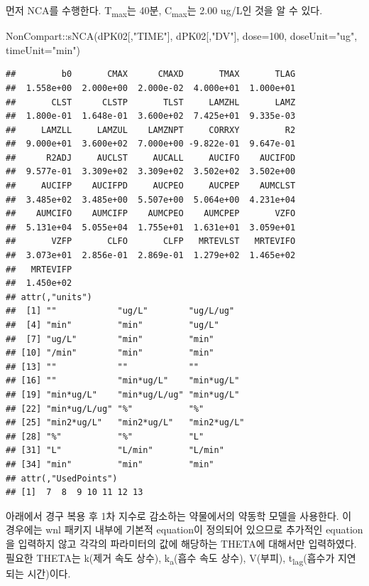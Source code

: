 \documentclass[
  11pt,
  krantz2, a4paper, twoside]{krantz}
\newenvironment{Shaded}{\begin{snugshade}}{\end{snugshade}}
\newcommand{\AttributeTok}[1]{\textcolor[rgb]{0.77,0.63,0.00}{#1}}
\newcommand{\DecValTok}[1]{\textcolor[rgb]{0.00,0.00,0.81}{#1}}
\newcommand{\FunctionTok}[1]{\textcolor[rgb]{0.00,0.00,0.00}{#1}}
\newcommand{\NormalTok}[1]{#1}
\newcommand{\SpecialCharTok}[1]{\textcolor[rgb]{0.00,0.00,0.00}{#1}}
\newcommand{\StringTok}[1]{\textcolor[rgb]{0.31,0.60,0.02}{#1}}
\theoremstyle{definition}
\theoremstyle{definition}
\theoremstyle{definition}
\theoremstyle{definition}
\theoremstyle{remark}
\begin{document}
먼저 NCA를 수행한다. T\textsubscript{max}는 40분, C\textsubscript{max}는 2.00 ug/L인 것을 알 수 있다.

\begin{Shaded}
\begin{Highlighting}[]
\NormalTok{NonCompart}\SpecialCharTok{::}\FunctionTok{sNCA}\NormalTok{(dPK02[,}\StringTok{"TIME"}\NormalTok{], dPK02[,}\StringTok{"DV"}\NormalTok{], }
                 \AttributeTok{dose=}\DecValTok{100}\NormalTok{, }\AttributeTok{doseUnit=}\StringTok{"ug"}\NormalTok{, }\AttributeTok{timeUnit=}\StringTok{"min"}\NormalTok{)}
\end{Highlighting}
\end{Shaded}

\begin{verbatim}
##         b0       CMAX      CMAXD       TMAX       TLAG 
##  1.558e+00  2.000e+00  2.000e-02  4.000e+01  1.000e+01 
##       CLST      CLSTP       TLST     LAMZHL       LAMZ 
##  1.800e-01  1.648e-01  3.600e+02  7.425e+01  9.335e-03 
##     LAMZLL     LAMZUL    LAMZNPT     CORRXY         R2 
##  9.000e+01  3.600e+02  7.000e+00 -9.822e-01  9.647e-01 
##      R2ADJ     AUCLST     AUCALL     AUCIFO    AUCIFOD 
##  9.577e-01  3.309e+02  3.309e+02  3.502e+02  3.502e+00 
##     AUCIFP    AUCIFPD     AUCPEO     AUCPEP    AUMCLST 
##  3.485e+02  3.485e+00  5.507e+00  5.064e+00  4.231e+04 
##    AUMCIFO    AUMCIFP    AUMCPEO    AUMCPEP       VZFO 
##  5.131e+04  5.055e+04  1.755e+01  1.631e+01  3.059e+01 
##       VZFP       CLFO       CLFP   MRTEVLST   MRTEVIFO 
##  3.073e+01  2.856e-01  2.869e-01  1.279e+02  1.465e+02 
##   MRTEVIFP 
##  1.450e+02 
## attr(,"units")
##  [1] ""            "ug/L"        "ug/L/ug"    
##  [4] "min"         "min"         "ug/L"       
##  [7] "ug/L"        "min"         "min"        
## [10] "/min"        "min"         "min"        
## [13] ""            ""            ""           
## [16] ""            "min*ug/L"    "min*ug/L"   
## [19] "min*ug/L"    "min*ug/L/ug" "min*ug/L"   
## [22] "min*ug/L/ug" "%"           "%"          
## [25] "min2*ug/L"   "min2*ug/L"   "min2*ug/L"  
## [28] "%"           "%"           "L"          
## [31] "L"           "L/min"       "L/min"      
## [34] "min"         "min"         "min"        
## attr(,"UsedPoints")
## [1]  7  8  9 10 11 12 13
\end{verbatim}

아래에서 경구 복용 후 1차 지수로 감소하는 약물에서의 약동학 모델을 사용한다. 
이 경우에는 wnl 패키지 내부에 기본적 equation이 정의되어 있으므로 추가적인 equation을 입력하지 않고 각각의 파라미터의 값에 해당하는 THETA에 대해서만 입력하였다.
필요한 THETA는 k(제거 속도 상수), k\textsubscript{a}(흡수 속도 상수), V(부피), t\textsubscript{lag}(흡수가 지연되는 시간)이다.
\end{document}
